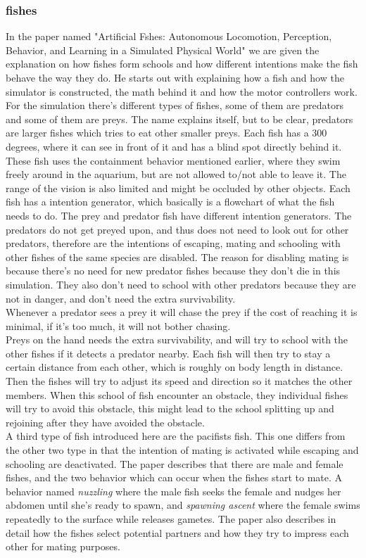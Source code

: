 \subsubsection{fishes}
In the paper named "Artificial Fshes: Autonomous Locomotion, Perception, Behavior, and Learning in a Simulated Physical World" \citep{Demetri1994} we are given the explanation on how fishes form schools and how different intentions make the fish behave the way they do. He starts out with explaining how a fish and how the simulator is constructed, the math behind it and how the motor controllers work. For the simulation there's different types of fishes, some of them are predators and some of them are preys. The name explains itself, but to be clear, predators are larger fishes which tries to eat other smaller preys. Each fish has a 300 degrees, where it can see in front of it and has a blind spot directly behind it. These fish uses the containment behavior mentioned earlier, where they swim freely around in the aquarium, but are not allowed to/not able to leave it.
The range of the vision is also limited and might be occluded by other objects. Each fish has a intention generator, which basically is a flowchart of what the fish needs to do. The prey and predator fish have different intention generators. The predators do not get preyed upon, and thus does not need to look out for other predators, therefore are the intentions of escaping, mating and schooling with other fishes of the same species are disabled. The reason for disabling mating is because there's no need for new predator fishes because they don't die in this simulation. They also don't need to school with other predators because they are not in danger, and don't need the extra survivability.\\
Whenever a predator sees a prey it will chase the prey if the cost of reaching it is minimal, if it's too much, it will not bother chasing. \\
Preys on the hand needs the extra survivability, and will try to school with the other fishes if it detects a predator nearby. Each fish will then try to stay a certain distance from each other, which is roughly on body length in distance. Then the fishes will try to adjust its speed and direction so it matches the other members. When this school of fish encounter an obstacle, they individual fishes will try to avoid this obstacle, this might lead to the school splitting up and rejoining after they have avoided the obstacle. \\
A third type of fish introduced here are the pacifists fish. This one differs from the other two type in that the intention of mating is activated while escaping and schooling are deactivated.
The paper describes that there are male and female fishes, and the two behavior which can occur when the fishes start to mate. A behavior named \textit{nuzzling} where the male fish seeks the female and nudges her abdomen until she's ready to spawn, and \textit{spawning ascent} where the female swims repeatedly to the surface while releases gametes. The paper also describes in detail how the fishes select potential partners and how they try to impress each other for mating purposes.

